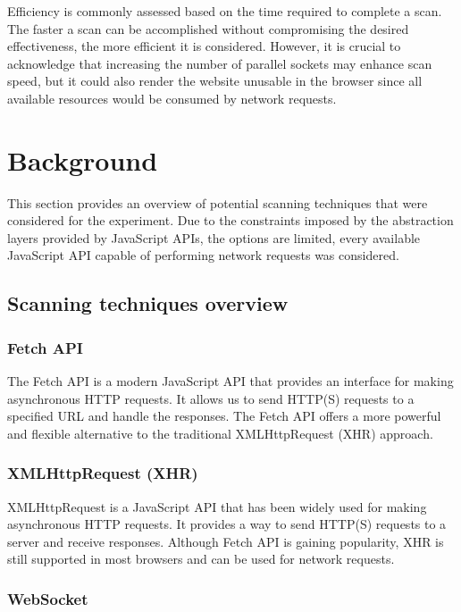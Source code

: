 Efficiency is commonly assessed based on the time required to complete a scan. The faster a scan can be accomplished without compromising the desired effectiveness, the more efficient it is considered. However, it is crucial to acknowledge that increasing the number of parallel sockets may enhance scan speed, but it could also render the website unusable in the browser since all available resources would be consumed by network requests.


\section{Background}

This section provides an overview of potential scanning techniques that were considered for the experiment. Due to the constraints imposed by the abstraction layers provided by JavaScript APIs, the options are limited, every available JavaScript API capable of performing network requests was considered.

\subsection{Scanning techniques overview}
\subsubsection{Fetch API}

The Fetch API is a modern JavaScript API that provides an interface for making asynchronous HTTP requests. It allows us to send HTTP(S) requests to a specified URL and handle the responses. The Fetch API offers a more powerful and flexible alternative to the traditional XMLHttpRequest (XHR) approach.

\subsubsection{XMLHttpRequest (XHR)}

XMLHttpRequest is a JavaScript API that has been widely used for making asynchronous HTTP requests. It provides a way to send HTTP(S) requests to a server and receive responses. Although Fetch API is gaining popularity, XHR is still supported in most browsers and can be used for network requests.

\subsubsection{WebSocket}


